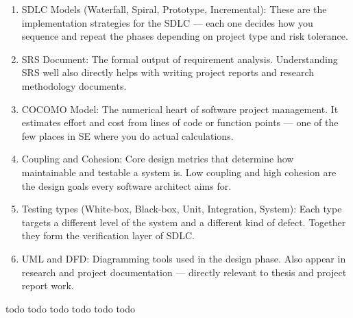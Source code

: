 \documentclass{report}
\begin{document}
\begin{con}
\begin{enumerate}
    \item SDLC Models (Waterfall, Spiral, Prototype, Incremental): These are the implementation strategies for the SDLC — each one decides how you sequence and repeat the phases depending on project type and risk tolerance.
    \item SRS Document: The formal output of requirement analysis. Understanding SRS well also directly helps with writing project reports and research methodology documents.
    \item COCOMO Model: The numerical heart of software project management. It estimates effort and cost from lines of code or function points — one of the few places in SE where you do actual calculations.
    \item Coupling and Cohesion: Core design metrics that determine how maintainable and testable a system is. Low coupling and high cohesion are the design goals every software architect aims for.
    \item Testing types (White-box, Black-box, Unit, Integration, System): Each type targets a different level of the system and a different kind of defect. Together they form the verification layer of SDLC.
    \item UML and DFD: Diagramming tools used in the design phase. Also appear in research and project documentation — directly relevant to thesis and project report work.
\end{enumerate}
\end{con}
\sol todo
\sol todo
\sol todo
\sol todo
\sol todo
\sol todo
\end{document}
